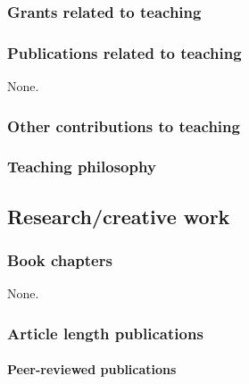 \subsubsection{Grants related to teaching}


\subsubsection{Publications related to teaching}
None.

\subsubsection{Other contributions to teaching}


\subsubsection{Teaching philosophy}


\subsection{Research/creative work}

\subsubsection{Book chapters}
None.

\subsubsection{Article length publications}



\paragraph{Peer-reviewed publications}

